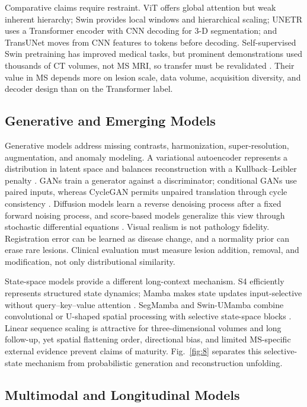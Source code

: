 \documentclass[journal,twoside,web]{ieeecolor}
\begin{document}
Comparative claims require restraint. ViT offers global attention but weak inherent hierarchy; Swin provides local windows and hierarchical scaling; UNETR uses a Transformer encoder with CNN decoding for 3-D segmentation; and TransUNet moves from CNN features to tokens before decoding. Self-supervised Swin pretraining has improved medical tasks, but prominent demonstrations used thousands of CT volumes, not MS MRI, so transfer must be revalidated \cite{swin_ssl}. Their value in MS depends more on lesion scale, data volume, acquisition diversity, and decoder design than on the Transformer label.


\subsection{Generative and Emerging Models}\label{subsec:generative-and-emerging-models}

Generative models address missing contrasts, harmonization, super-resolution, augmentation, and anomaly modeling. A variational autoencoder represents a distribution in latent space and balances reconstruction with a Kullback--Leibler penalty \cite{vae}. GANs train a generator against a discriminator; conditional GANs use paired inputs, whereas CycleGAN permits unpaired translation through cycle consistency \cite{gan,pix2pix,cyclegan}. Diffusion models learn a reverse denoising process after a fixed forward noising process, and score-based models generalize this view through stochastic differential equations \cite{ddpm,scoresde}. Visual realism is not pathology fidelity. Registration error can be learned as disease change, and a normality prior can erase rare lesions. Clinical evaluation must measure lesion addition, removal, and modification, not only distributional similarity.


State-space models provide a different long-context mechanism. S4 efficiently represents structured state dynamics; Mamba makes state updates input-selective without query--key--value attention \cite{s4,mamba}. SegMamba and Swin-UMamba combine convolutional or U-shaped spatial processing with selective state-space blocks \cite{segmamba,swinumamba}. Linear sequence scaling is attractive for three-dimensional volumes and long follow-up, yet spatial flattening order, directional bias, and limited MS-specific external evidence prevent claims of maturity. Fig.~\ref{fig:8} separates this selective-state mechanism from probabilistic generation and reconstruction unfolding.


\subsection{Multimodal and Longitudinal Models}\label{subsec:multimodal-and-longitudinal-models}
\end{document}
